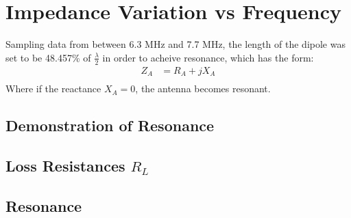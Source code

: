 \section{Impedance Variation vs Frequency}
Sampling data from between 6.3 MHz and 7.7 MHz, the length of the dipole was
set to be 48.457\% of $\frac{\lambda}{2}$ in order to acheive resonance, which
has the form:
\begin{align}
Z_A&=R_A+jX_A\\
\end{align}
Where if the reactance $X_A=0$, the antenna becomes resonant.
\subsection{Demonstration of Resonance}
\subsection{Loss Resistances $R_L$}
\subsection{Resonance}
